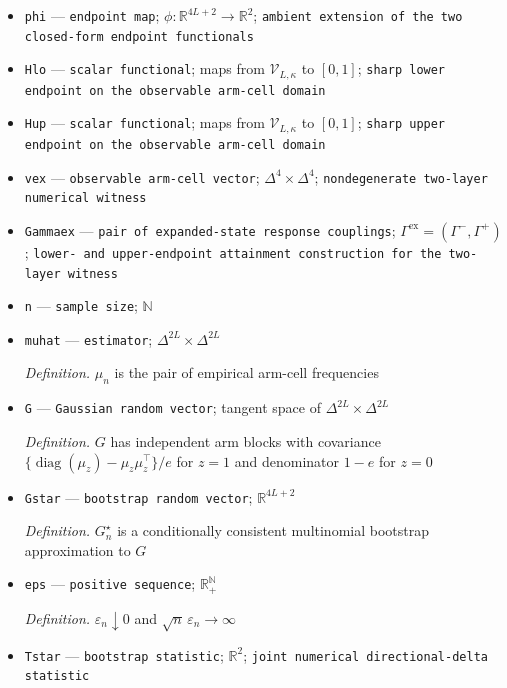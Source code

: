 \documentclass{article}
\begin{document}
\begin{itemize}
  \item \texttt{phi} --- \texttt{endpoint map}; \(\phi:\mathbb R^{4L+2}\to\mathbb R^2\); \texttt{ambient extension of the two closed-\allowbreak{}form endpoint functionals}
  \item \texttt{Hlo} --- \texttt{scalar functional}; maps from \(\mathcal V_{L,\kappa}\) to \([0,1]\); \texttt{sharp lower endpoint on the observable arm-\allowbreak{}cell domain}
  \item \texttt{Hup} --- \texttt{scalar functional}; maps from \(\mathcal V_{L,\kappa}\) to \([0,1]\); \texttt{sharp upper endpoint on the observable arm-\allowbreak{}cell domain}
  \item \texttt{vex} --- \texttt{observable arm-\allowbreak{}cell vector}; \(\Delta^4\times\Delta^4\); \texttt{nondegenerate two-\allowbreak{}layer numerical witness}
  \item \texttt{Gammaex} --- \texttt{pair of expanded-\allowbreak{}state response couplings}; \(\Gamma^{\mathrm{ex}}=(\Gamma^-,\Gamma^+)\); \texttt{lower-\allowbreak{} and upper-\allowbreak{}endpoint attainment construction for the two-\allowbreak{}layer witness}
  \item \texttt{n} --- \texttt{sample size}; \(\mathbb N\)
  \item \texttt{muhat} --- \texttt{estimator}; \(\Delta^{2L}\times\Delta^{2L}\)
  \par\smallskip\noindent\emph{Definition.} \(\widehat\mu_n\) is the pair of empirical arm-cell frequencies
  \item \texttt{G} --- \texttt{Gaussian random vector}; tangent space of \(\Delta^{2L}\times\Delta^{2L}\)
  \par\smallskip\noindent\emph{Definition.} \(G\) has independent arm blocks with covariance \(\{\operatorname{diag}(\mu_z)-\mu_z\mu_z^{\top}\}/e\) for \(z=1\) and denominator \(1-e\) for \(z=0\)
  \item \texttt{Gstar} --- \texttt{bootstrap random vector}; \(\mathbb R^{4L+2}\)
  \par\smallskip\noindent\emph{Definition.} \(G_n^{\star}\) is a conditionally consistent multinomial bootstrap approximation to \(G\)
  \item \texttt{eps} --- \texttt{positive sequence}; \(\mathbb R_+^{\mathbb N}\)
  \par\smallskip\noindent\emph{Definition.} \(\varepsilon_n\downarrow0\) and \(\sqrt n\,\varepsilon_n\to\infty\)
  \item \texttt{Tstar} --- \texttt{bootstrap statistic}; \(\mathbb R^2\); \texttt{joint numerical directional-\allowbreak{}delta statistic}

\end{itemize}
\end{document}
